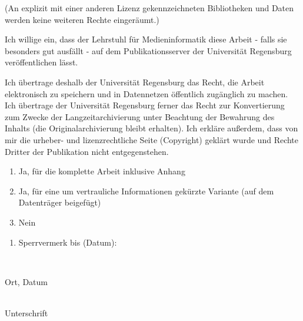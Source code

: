 {
	\noindent\footnotesize (An explizit mit einer anderen Lizenz gekennzeichneten Bibliotheken und Daten werden keine weiteren Rechte eingeräumt.)\\
}

\noindent Ich willige ein, dass der Lehrstuhl für Medieninformatik diese Arbeit - falls sie besonders gut ausfällt - auf dem Publikationsserver der Universität Regensburg veröffentlichen lässt.

\noindent Ich übertrage deshalb der Universität Regensburg das Recht, die Arbeit elektronisch zu speichern und in Datennetzen öffentlich zugänglich zu machen. Ich übertrage der Universität Regensburg ferner das Recht zur Konvertierung zum Zwecke der Langzeitarchivierung unter Beachtung der Bewahrung des Inhalts (die Originalarchivierung bleibt erhalten). Ich erkläre außerdem, dass von mir die urheber- und lizenzrechtliche Seite (Copyright) geklärt wurde und Rechte Dritter der Publikation nicht entgegenstehen.
\begin{enumerate}[noitemsep]
	\item[\XBox] Ja, für die komplette Arbeit inklusive Anhang
	\item[\Square] Ja, für eine um vertrauliche Informationen gekürzte Variante (auf dem Datenträger beigefügt)
	\item[\Square] Nein
\end{enumerate}
\begin{enumerate}[noitemsep]
	\item[\Square] Sperrvermerk bis (Datum):
\end{enumerate}

\vspace{55pt}
\null\parbox{5.5cm}{\hrulefill\\\raggedright Ort, Datum}
\null\hfill\parbox{5.5cm}{\hrulefill\\\raggedleft Unterschrift}